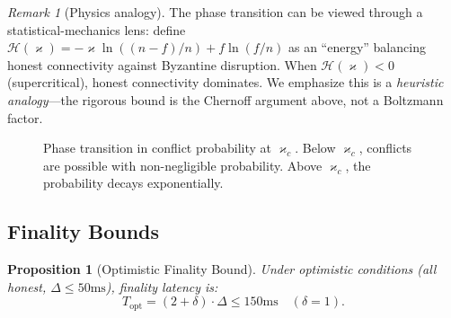 \documentclass[11pt,a4paper]{article}
\newtheorem{proposition}[theorem]{Proposition}
\theoremstyle{definition}
\theoremstyle{remark}
\newtheorem{remark}[theorem]{Remark}
\renewcommand{\kappa}{\varkappa}
\begin{document}
\begin{remark}[Physics analogy]\label{rem:hamiltonian}
The phase transition can be viewed through a statistical-mechanics lens:
define $\mathcal{H}(\kappa) = -\kappa \ln((n\!-\!f)/n) + f \ln(f/n)$
as an ``energy'' balancing honest connectivity against Byzantine
disruption.
When $\mathcal{H}(\kappa) < 0$ (supercritical), honest connectivity
dominates.
We emphasize this is a \emph{heuristic analogy}---the rigorous bound is
the Chernoff argument above, not a Boltzmann factor.
\end{remark}

\begin{figure}[t]
\centering
{}
\caption{Phase transition in conflict probability at $\kappa_c$.
Below $\kappa_c$, conflicts are possible with non-negligible probability.
Above $\kappa_c$, the probability decays exponentially.}
\label{fig:phase-transition}
\end{figure}

\subsection{Finality Bounds}

\begin{proposition}[Optimistic Finality Bound]\label{prop:optimistic-finality}
Under optimistic conditions (all honest, $\Delta \leq 50\text{ms}$),
finality latency is:
\[
  T_{\text{opt}} = (2 + \delta) \cdot \Delta \leq 150\text{ms} \quad (\delta = 1).
\]
\end{proposition}
\end{document}
